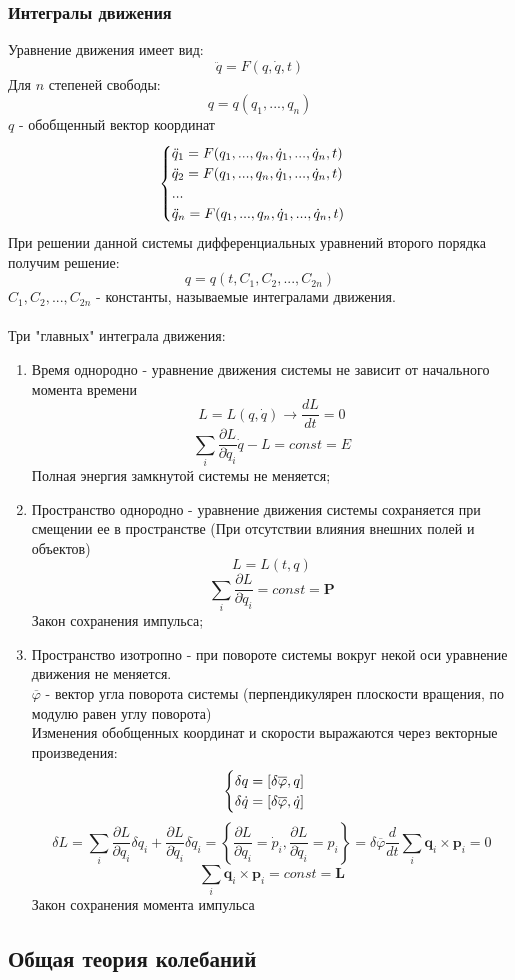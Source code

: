 \subsubsection{Интегралы движения}
Уравнение движения имеет вид:
$$\ddot q = F(q,\dot q,t)$$
Для $n$ степеней свободы:
$$q = q(q_{1},...,q_{n})$$
$q$ - обобщенный вектор координат
\begin{equation*}
 \begin{cases}
   $$\ddot q_{1} = F(q_{1},...,q_{n},\dot q_{1},...,\dot q_{n},t)$$\\
   $$\ddot q_{2} = F(q_{1},...,q_{n},\dot q_{1},...,\dot q_{n},t)$$\\
   ...\\
   $$\ddot q_{n} = F(q_{1},...,q_{n},\dot q_{1},...,\dot q_{n},t)$$
 \end{cases}
\end{equation*}
При решении данной системы дифференциальных уравнений второго порядка получим решение:
$$q=q(t,C_{1},C_{2},...,C_{2n})$$
$C_{1},C_{2},...,C_{2n}$ - константы, называемые интегралами движения.\\\\
Три "главных" интеграла движения:
\begin{enumerate}
    \item Время однородно - уравнение движения системы не зависит от начального момента времени
    $$L=L(q,\dot q)\longrightarrow \frac{dL}{dt}=0$$
    $$\sum_{i}\frac{\partial L}{\partial \dot q_{i}}\dot q-L=const=E$$
    Полная энергия замкнутой системы не меняется;
    \item Пространство однородно - уравнение движения системы сохраняется при смещении ее в пространстве (При отсутствии влияния внешних полей и объектов)
    $$L=L(t,q)$$
    $$\sum_{i}\frac{\partial L}{\partial \dot q_{i}}=const=\textbf{P}$$
    Закон сохранения импульса;
    \item Пространство изотропно - при повороте системы вокруг некой оси уравнение движения не меняется.\\
    $\overline{\varphi}$ - вектор угла поворота системы (перпендикулярен плоскости вращения, по модулю равен углу поворота)\\
    Изменения обобщенных координат и скорости выражаются через векторные произведения:
    \begin{equation*}
     \begin{cases}
       $$\delta q=[\delta\overline{\varphi},q]$$\\
       $$\delta\dot q=[\delta\overline{\varphi},\dot q]$$
     \end{cases}
    \end{equation*}
    $$\delta L = \sum_{i} \frac{\partial L}{\partial q_{i}}\delta q_{i} + \frac{\partial L}{\partial \dot q_{i}}\delta \dot q_{i} =\left\{\frac{\partial L}{\partial q_{i}} = \dot p_{i}, \frac{\partial L}{\partial \dot q_{i}} = p_{i} \right\}= \delta \overline{\varphi}\frac{d}{dt}\sum_{i}\textbf{q}_{i}\times \textbf{p}_{i}=0$$
    $$\sum_{i}\textbf{q}_{i}\times \textbf{p}_{i} = const = \textbf{L}$$
    Закон сохранения момента импульса
\end{enumerate}


\subsection{Общая теория колебаний}
